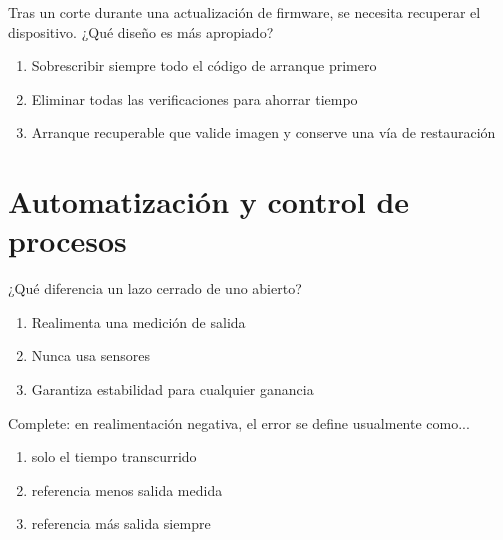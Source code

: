 \noindent\begin{minipage}{\linewidth}\setlength{\parskip}{4pt}\label{q:H-071}
Tras un corte durante una actualización de firmware, se necesita recuperar el dispositivo. ¿Qué diseño es más apropiado?
\begin{enumerate}[label=\Alph*),nosep]
\item Sobrescribir siempre todo el código de arranque primero
\item Eliminar todas las verificaciones para ahorrar tiempo
\item Arranque recuperable que valide imagen y conserve una vía de restauración
\end{enumerate}\end{minipage}\par\medskip

\section{Automatización y control de procesos}

\noindent\begin{minipage}{\linewidth}\setlength{\parskip}{4pt}\label{q:H-072}
¿Qué diferencia un lazo cerrado de uno abierto?
\begin{enumerate}[label=\Alph*),nosep]
\item Realimenta una medición de salida
\item Nunca usa sensores
\item Garantiza estabilidad para cualquier ganancia
\end{enumerate}\end{minipage}\par\medskip

\noindent\begin{minipage}{\linewidth}\setlength{\parskip}{4pt}\label{q:H-073}
Complete: en realimentación negativa, el error se define usualmente como...
\begin{enumerate}[label=\Alph*),nosep]
\item solo el tiempo transcurrido
\item referencia menos salida medida
\item referencia más salida siempre
\end{enumerate}\end{minipage}\par\medskip

